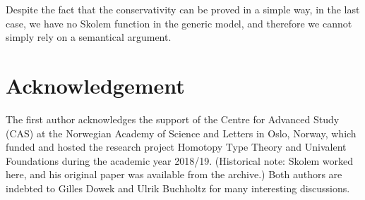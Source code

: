\documentclass{fundam}
\begin{document}
Despite the fact that the conservativity can be proved in a simple way, 
in the last case, we have no Skolem function in the generic model, 
and therefore we cannot simply rely on a semantical argument.


\section{Acknowledgement}
The first author acknowledges the support of the Centre for Advanced Study (CAS)
at the Norwegian Academy of Science and Letters
in Oslo, Norway, which funded and hosted the research project Homotopy Type Theory and Univalent Foundations during the academic year 2018/19. 
(Historical note: Skolem worked here, 
and his original paper \cite{Skolem} was available from the archive.)
Both authors are indebted to Gilles Dowek and Ulrik Buchholtz for many interesting discussions.
\end{document}

